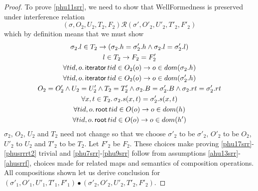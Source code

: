 \begin{proof}
To prove \ref{phu11srr}, we need to show that \textsf{WellFormed}ness is preserved under interference relation
\[(\sigma, O_2, U_2, T_2,F_2) \mathcal{R} (\sigma', O'_2, U'_2, T'_2,F'_2)  \]
which by definition means that we must show 
\begin{gather}\label{phu17srr}
  \sigma_2.l  \in  T_2 \rightarrow (\sigma_2.h =\sigma'_2.h \land \sigma_2.l=\sigma'_2.l)\\
  \label{phu18srr}
  l\in T_2\rightarrow F_2=F_2'\\
  \label{phu20srr}
  \forall tid,o\ldotp\textsf{iterator} \, tid \in O_2(o) \rightarrow o \in dom(\sigma_2.h) \\
  \label{phu21srr}
  \forall tid,o\ldotp\textsf{iterator} \, tid \in O_2(o) \rightarrow o \in dom(\sigma'_2.h) \\
  \label{phu22srr}
  O_2 = O_2' \land U_2 = U_2' \land T_2 = T_2'\land \sigma_2.B = \sigma'_2.B \land \sigma_2.rt = \sigma'_2.rt \\
  \label{phu23srr}
  \forall x, t \in T_2 \ldotp \sigma_2.s(x,t) = \sigma'_2.s(x,t) \\
    \label{phusrrrt1}
  \forall tid,o\ldotp\textsf{root} \, tid \in O(o) \rightarrow o \in dom(h) \\
  \label{phusrrrt2}
  \forall tid,o\ldotp\textsf{root} \, tid \in O(o) \rightarrow o \in dom(h') 
\end{gather}
$\sigma_2$, $O_2$, $U_2$ and $T_2$ need not change so that we choose $\sigma'_2$ to be $\sigma'_2$, $O'_2$ to be $O_2$, $U'_2$ to $U_2$ and $T'_2$ to be $T_2$. Let $F'_2$ be $F_2$. These choices make proving \ref{phu17srr}-\ref{phusrrrt2} trivial and  \ref{phu7srr}-\ref{phu9srr} follow from assumptions \ref{ahu13srr}-\ref{ahusrrf}, choices made for related maps and semantics of composition operations. All compositions shown let us derive conclusion for $(\sigma'_1,O'_1,U'_1,T'_1,F'_1) \bullet (\sigma'_2,O'_2,U'_2,T'_2,F'_2)$.
  \end{proof}

